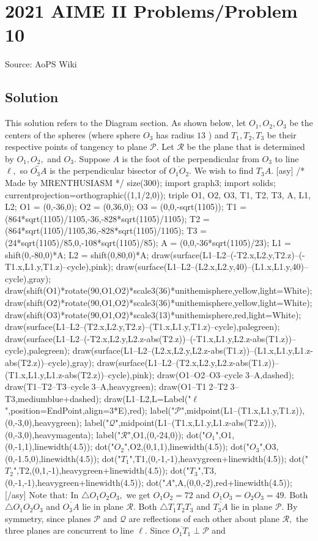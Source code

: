 \documentclass[12pt]{article}
\begin{document}
\section*{{2021 AIME II Problems/Problem 10}}
Source: AoPS Wiki

\subsection*{Solution}
This solution refers to the Diagram section. As shown below, let $O_1,O_2,O_3$ be the centers of the spheres (where sphere $O_3$ has radius $13$ ) and $T_1,T_2,T_3$ be their respective points of tangency to plane $\mathcal{P}.$ Let $\mathcal{R}$ be the plane that is determined by $O_1,O_2,$ and $O_3.$ Suppose $A$ is the foot of the perpendicular from $O_3$ to line $\ell,$ so $\overleftrightarrow{O_3A}$ is the perpendicular bisector of $\overline{O_1O_2}.$ We wish to find $T_3A.$ [asy] /* Made by MRENTHUSIASM */ size(300); import graph3; import solids; currentprojection=orthographic((1,1/2,0)); triple O1, O2, O3, T1, T2, T3, A, L1, L2; O1 = (0,-36,0); O2 = (0,36,0); O3 = (0,0,-sqrt(1105)); T1 = (864*sqrt(1105)/1105,-36,-828*sqrt(1105)/1105); T2 = (864*sqrt(1105)/1105,36,-828*sqrt(1105)/1105); T3 = (24*sqrt(1105)/85,0,-108*sqrt(1105)/85); A = (0,0,-36*sqrt(1105)/23); L1 = shift(0,-80,0)*A; L2 = shift(0,80,0)*A; draw(surface(L1--L2--(-T2.x,L2.y,T2.z)--(-T1.x,L1.y,T1.z)--cycle),pink); draw(surface(L1--L2--(L2.x,L2.y,40)--(L1.x,L1.y,40)--cycle),gray); draw(shift(O1)*rotate(90,O1,O2)*scale3(36)*unithemisphere,yellow,light=White); draw(shift(O2)*rotate(90,O1,O2)*scale3(36)*unithemisphere,yellow,light=White); draw(shift(O3)*rotate(90,O1,O2)*scale3(13)*unithemisphere,red,light=White); draw(surface(L1--L2--(T2.x,L2.y,T2.z)--(T1.x,L1.y,T1.z)--cycle),palegreen); draw(surface(L1--L2--(-T2.x,L2.y,L2.z-abs(T2.z))--(-T1.x,L1.y,L2.z-abs(T1.z))--cycle),palegreen); draw(surface(L1--L2--(L2.x,L2.y,L2.z-abs(T1.z))--(L1.x,L1.y,L1.z-abs(T2.z))--cycle),gray); draw(surface(L1--L2--(T2.x,L2.y,L2.z-abs(T1.z))--(T1.x,L1.y,L1.z-abs(T2.z))--cycle),pink); draw(O1--O2--O3--cycle^^O3--A,dashed); draw(T1--T2--T3--cycle^^T3--A,heavygreen); draw(O1--T1^^O2--T2^^O3--T3,mediumblue+dashed); draw(L1--L2,L=Label("$\ell$",position=EndPoint,align=3*E),red); label("$\mathcal{P}$",midpoint(L1--(T1.x,L1.y,T1.z)),(0,-3,0),heavygreen); label("$\mathcal{Q}$",midpoint(L1--(T1.x,L1.y,L1.z-abs(T2.z))),(0,-3,0),heavymagenta); label("$\mathcal{R}$",O1,(0,-24,0)); dot("$O_1$",O1,(0,-1,1),linewidth(4.5)); dot("$O_2$",O2,(0,1,1),linewidth(4.5)); dot("$O_3$",O3,(0,-1.5,0),linewidth(4.5)); dot("$T_1$",T1,(0,-1,-1),heavygreen+linewidth(4.5)); dot("$T_2$",T2,(0,1,-1),heavygreen+linewidth(4.5)); dot("$T_3$",T3,(0,-1,-1),heavygreen+linewidth(4.5)); dot("$A$",A,(0,0,-2),red+linewidth(4.5)); [/asy] Note that: In $\triangle O_1O_2O_3,$ we get $O_1O_2=72$ and $O_1O_3=O_2O_3=49.$ Both $\triangle O_1O_2O_3$ and $\overline{O_3A}$ lie in plane $\mathcal{R}.$ Both $\triangle T_1T_2T_3$ and $\overline{T_3A}$ lie in plane $\mathcal{P}.$ By symmetry, since planes $\mathcal{P}$ and $\mathcal{Q}$ are reflections of each other about plane $\mathcal{R},$ the three planes are concurrent to line $\ell.$ Since $\overline{O_1T_1}\perp\mathcal{P}$ and 
\end{document}
